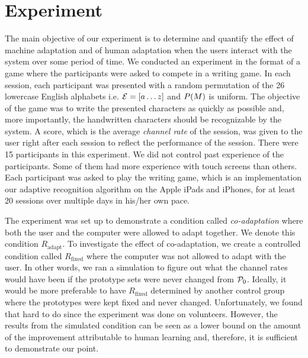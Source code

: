 \documentclass{sigchi}
\begin{document}
\section{Experiment}
\label{sec:experiment}

\newcommand{\RAdapt}{R_{\mathrm{adapt}}}
\newcommand{\RFixed}{R_{\mathrm{fixed}}}
\newcommand{\RIdeal}{R_{\mathrm{ideal}}}

The main objective of our experiment is to determine and quantify the
effect of machine adaptation and of human adaptation when the users
interact with the system over some period of time.  We conducted an
experiment in the format of a game where the participants were asked
to compete in a writing game. In each session, each participant was
presented with a random permutation of the 26 lowercase English
alphabets i.e. $\mathcal{E} = \left[ a \ldots z \right]$ and
$P(M)$ is uniform. The objective of the game was to write the
presented characters as quickly as possible and, more importantly, the
handwritten characters should be recognizable by the system. A score,
which is the average {\it channel rate} of the session, was given to
the user right after each session to reflect the performance of the
session. There were 15 participants in this experiment. We did not
control past experience of the participants. Some of them had more
experience with touch screens than others. Each participant was asked
to play the writing game, which is an implementation our adaptive
recognition algorithm on the Apple iPads and iPhones, for at least 20
sessions over multiple days in his/her own pace.

The experiment was set up to demonstrate a condition called {\em
  co-adaptation} where both the user and the computer were allowed to
adapt together. We denote this condition $\RAdapt$. To investigate the
effect of co-adaptation, we create a controlled condition called
$\RFixed$ where the computer was not allowed to adapt with the
user. In other words, we ran a simulation to figure out what the
channel rates would have been if the prototype sets were never changed
from $\mathcal{P}_0$. Ideally, it would be more preferable to have
$\RFixed$ determined by another control group where the prototypes
were kept fixed and never changed. Unfortunately, we found that hard to
do since the experiment was done on volunteers. However, the results
from the simulated condition can be seen as a lower bound on the
amount of the improvement attributable to human learning and, therefore,
it is sufficient to demonstrate our point.
\end{document}
